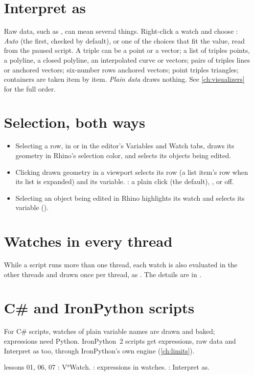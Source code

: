 \section{Interpret as}\label{sec:interpretas}

Raw data, such as \code{[(0,0,0), (5,0,0), (5,5,0)]}, can mean several things. Right-click a watch and
choose : \emph{Auto} (the first, checked by default), or one of the choices that fit the
value, read from the paused script. A triple can be a point or a vector; a list of triples points, a
polyline, a closed polyline, an interpolated curve or vectors; pairs of triples lines or anchored
vectors; six-number rows anchored vectors; point triples triangles; containers are taken item by item.
\emph{Plain data} draws nothing. See \cref{ch:visualizers} for the full order.

\section{Selection, both ways}\label{sec:selection}

\begin{itemize}
  \item Selecting a row, in  or in the editor's Variables and Watch tabs, draws its geometry in
        Rhino's selection color, and selects its objects being edited.
  \item Clicking drawn geometry in a viewport selects its row (a list item's row when its list is
        expanded) and its variable. : a plain click (the
        default), , or off.
  \item Selecting an object being edited in Rhino highlights its watch and selects its variable
        ().
\end{itemize}

\section{Watches in every thread}

While a script runs more than one thread, each watch is also evaluated in the other threads and drawn
once per thread, as . The details are in .

\section{C\# and IronPython scripts}

For C\# scripts, watches of plain variable names are drawn and baked; expressions need Python.
IronPython~2 scripts get expressions, raw data and Interpret as too, through IronPython's own engine
(\cref{ch:limits}).

\begin{lesson}{lessons 01, 06, 07}
: V°Watch. : expressions in watches.
: Interpret as.
\end{lesson}
